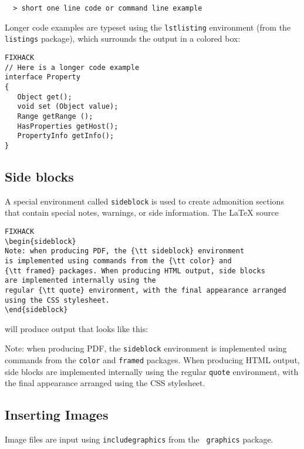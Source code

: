\documentclass{article}
\begin{document}
\begin{verbatim}
  > short one line code or command line example
\end{verbatim}

Longer code examples are typeset using the {\tt lstlisting}
environment (from the {\tt listings} package), which surrounds
the output in a colored box:

\begin{lstlisting}FIXHACK
// Here is a longer code example
interface Property
{
   Object get(); 
   void set (Object value); 
   Range getRange ();
   HasProperties getHost();
   PropertyInfo getInfo();
}
\end{lstlisting}

\subsection{Side blocks}
\label{SideBlocksSec}

A special environment called {\tt sideblock} is used to create
admonition sections that contain special notes, warnings, or side
information. The LaTeX source

\begin{lstlisting}FIXHACK
\begin{sideblock}
Note: when producing PDF, the {\tt sideblock} environment
is implemented using commands from the {\tt color} and
{\tt framed} packages. When producing HTML output, side blocks
are implemented internally using the
regular {\tt quote} environment, with the final appearance arranged
using the CSS stylesheet. 
\end{sideblock}
\end{lstlisting}

will produce output that looks like this:

\begin{sideblock}
Note: when producing PDF, the {\tt sideblock} environment
is implemented using commands from the {\tt color} and
{\tt framed} packages. When producing HTML output, side blocks
are implemented internally using the
regular {\tt quote} environment, with the final appearance arranged
using the CSS stylesheet. 
\end{sideblock}

\subsection{Inserting Images}

Image files are input using {\tt \BKS includegraphics} from the {\tt
graphics} package. 
\end{document}
